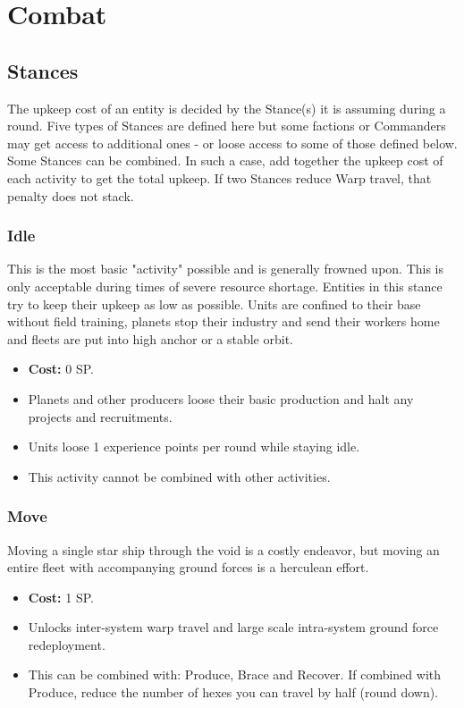 \chapter{Combat}
\section{Stances} \label{stances}
The upkeep cost of an entity is decided by the Stance(s) it is assuming during a round. Five types of Stances are defined here but some factions or Commanders may get access to additional ones - or loose access to some of those defined below. \\
Some Stances can be combined. In such a case, add together the upkeep cost of each activity to get the total upkeep. If two Stances reduce Warp travel, that penalty does not stack.

\subsection{Idle}\label{idle_stance}
This is the most basic "activity" possible and is generally frowned upon. This is only acceptable during times of severe resource shortage. Entities in this stance try to keep their upkeep as low as possible. Units are confined to their base without field training, planets stop their industry and send their workers home and fleets are put into high anchor or a stable orbit.
	\begin{itemize}
		\item \textbf{Cost:} 0 SP.
		\item Planets and other producers loose their basic production and halt any projects and recruitments.
		\item Units loose 1 experience points per round while staying idle.
		\item This activity cannot be combined with other activities.
	\end{itemize}

\subsection{Move}\label{move_stance}
Moving a single star ship through the void is a costly endeavor, but moving an entire fleet with accompanying ground forces is a herculean effort.
\begin{itemize}
	\item \textbf{Cost:} 1 SP.
	\item Unlocks inter-system warp travel and large scale intra-system ground force redeployment.
	\item This can be combined with: Produce, Brace and Recover. If combined with Produce, reduce the number of hexes you can travel by half (round down).
\end{itemize}

